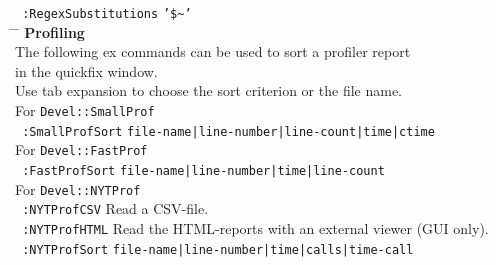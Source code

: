 \documentclass[oneside,10pt,landscape,DIV17]{scrartcl}
\begin{document}
\begin{multicols}{2}
{\begin{tabbing}
\texttt{ :RegexSubstitutions}   \> \texttt{'\$}\texttt{\~}\texttt{'}  \\[5.5ex]
%
\hspace{30mm} \= \hspace{50mm} \= \kill
%
\large{\textbf{Profiling}}\\[1.0ex]
%
The following ex commands can be used to sort a profiler report \\in the quickfix window.\\
Use tab expansion to choose the sort criterion or the file name.\\[2.0ex]
%
For \texttt{Devel::SmallProf}\\[1.0ex]
\texttt{ :SmallProfSort}   \> \texttt{file-name|line-number|line-count|time|ctime}\\[3.0ex]
%
%
For \texttt{Devel::FastProf}\\[1.0ex]
\texttt{ :FastProfSort}    \> \texttt{file-name|line-number|time|line-count}\\[3.0ex]
%
%
For \texttt{Devel::NYTProf}\\[1.0ex]
\texttt{ :NYTProfCSV}      \> Read a CSV-file.\\[1.0ex]
%
\texttt{ :NYTProfHTML}      \> Read the HTML-reports with an external viewer (GUI only).\\[1.0ex]
%
%
\texttt{ :NYTProfSort}     \> \texttt{file-name|line-number|time|calls|time-call}\\
%
\end{tabbing}
}
\end{multicols}%
%
\end{document}
